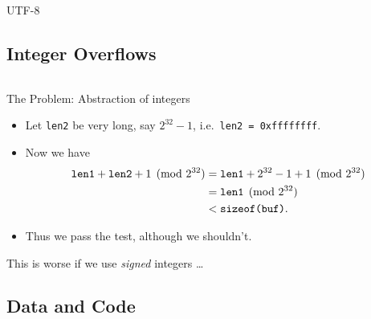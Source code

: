\begin{frame}
  \begin{block}{UTF-8}
  \end{block}
\end{frame}


\subsection{Integer Overflows}

\begin{frame}[fragile]
  \inputminted{C}{combine.c}
\end{frame}

\begin{frame}
  \begin{alertblock}{The Problem: Abstraction of integers}
    \begin{itemize}
      \item Let \texttt{len2} be very long, say \(2^{32} - 1\), i.e.\ 
        \texttt{len2 = 0xffffffff}.

      \item Now we have
        \begin{align*}
          \text{\texttt{len1}} + \text{\texttt{len2}} 
          + 1 \pmod{2^{32}}
          &= \text{\texttt{len1}} + 2^{32} - 1 + 1 \pmod{2^{32}} \\
          &= \text{\texttt{len1}} \pmod{2^{32}} \\
          &< \text{\texttt{sizeof(buf)}}.
        \end{align*}

      \item Thus we pass the test, although we shouldn't.
    \end{itemize}
  \end{alertblock}
\end{frame}

\begin{frame}
  \begin{remark}
    This is worse if we use \emph{signed} integers \dots
  \end{remark}
\end{frame}

\subsection{Data and Code}

